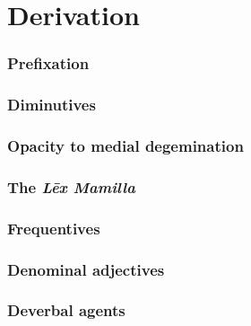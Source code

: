\chapter{Derivation}

\subsection{Prefixation}

\subsection{Diminutives}

\subsection{Opacity to medial degemination}

\subsection{The \emph{Lēx Mamilla}}

\subsection{Frequentives}

\subsection{Denominal adjectives}

\subsection{Deverbal agents}
